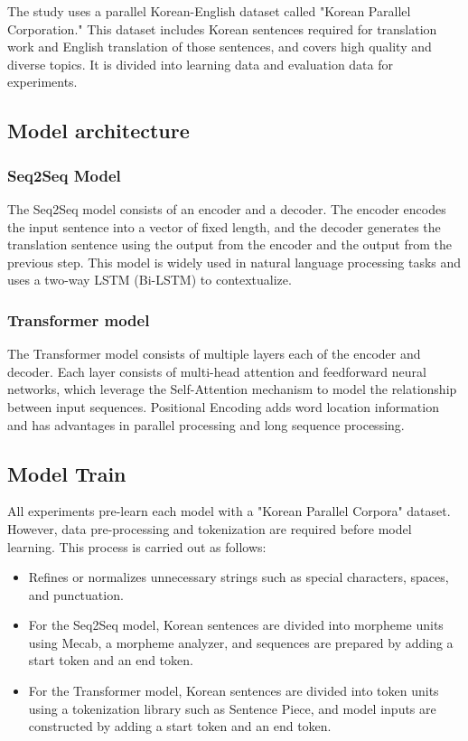 \documentclass{article}
\begin{document}
The study uses a parallel Korean-English dataset called "Korean Parallel Corporation." This dataset includes Korean sentences required for translation work and English translation of those sentences, and covers high quality and diverse topics. It is divided into learning data and evaluation data for experiments.

\subsection{Model architecture}


\subsubsection{Seq2Seq Model}
The Seq2Seq model consists of an encoder and a decoder. The encoder encodes the input sentence into a vector of fixed length, and the decoder generates the translation sentence using the output from the encoder and the output from the previous step. This model is widely used in natural language processing tasks and uses a two-way LSTM (Bi-LSTM) to contextualize.

\subsubsection{Transformer model}
The Transformer model consists of multiple layers each of the encoder and decoder. Each layer consists of multi-head attention and feedforward neural networks, which leverage the Self-Attention mechanism to model the relationship between input sequences. Positional Encoding adds word location information and has advantages in parallel processing and long sequence processing.

\subsection{Model Train}
All experiments pre-learn each model with a "Korean Parallel Corpora" dataset. However, data pre-processing and tokenization are required before model learning. This process is carried out as follows:
\begin{itemize}
    \item Refines or normalizes unnecessary strings such as special characters, spaces, and punctuation.
    \item For the Seq2Seq model, Korean sentences are divided into morpheme units using Mecab, a morpheme analyzer, and sequences are prepared by adding a start token and an end token.
    \item For the Transformer model, Korean sentences are divided into token units using a tokenization library such as Sentence Piece, and model inputs are constructed by adding a start token and an end token.
\end{itemize}
\end{document}
